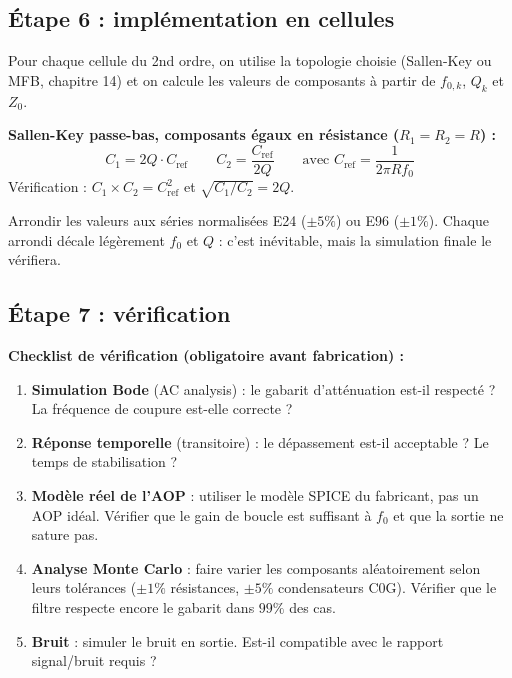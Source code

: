 \documentclass[12pt,a4paper,twoside]{book}
\begin{document}
\subsection{Étape 6 : implémentation en cellules}

Pour chaque cellule du 2nd ordre, on utilise la topologie choisie (Sallen-Key ou MFB, chapitre 14) et on calcule les valeurs de composants à partir de $f_{0,k}$, $Q_k$ et $Z_0$.

\begin{formule}
\textbf{Sallen-Key passe-bas, composants égaux en résistance ($R_1 = R_2 = R$) :}
\[
C_1 = 2Q \cdot C_{\text{ref}} \qquad C_2 = \frac{C_{\text{ref}}}{2Q} \qquad \text{avec } C_{\text{ref}} = \frac{1}{2\pi R f_0}
\]
Vérification : $C_1 \times C_2 = C_{\text{ref}}^2$ et $\sqrt{C_1/C_2} = 2Q$.
\end{formule}

\begin{pratique}
Arrondir les valeurs aux séries normalisées E24 ($\pm 5\%$) ou E96 ($\pm 1\%$). Chaque arrondi décale légèrement $f_0$ et $Q$ : c'est inévitable, mais la simulation finale le vérifiera.
\end{pratique}

\subsection{Étape 7 : vérification}

\begin{pratique}
\textbf{Checklist de vérification (obligatoire avant fabrication) :}

\begin{enumerate}[nosep]
\item \textbf{Simulation Bode} (AC analysis) : le gabarit d'atténuation est-il respecté ? La fréquence de coupure est-elle correcte ?
\item \textbf{Réponse temporelle} (transitoire) : le dépassement est-il acceptable ? Le temps de stabilisation ?
\item \textbf{Modèle réel de l'AOP} : utiliser le modèle SPICE du fabricant, pas un AOP idéal. Vérifier que le gain de boucle est suffisant à $f_0$ et que la sortie ne sature pas.
\item \textbf{Analyse Monte Carlo} : faire varier les composants aléatoirement selon leurs tolérances ($\pm 1\%$ résistances, $\pm 5\%$ condensateurs C0G). Vérifier que le filtre respecte encore le gabarit dans $99\%$ des cas.
\item \textbf{Bruit} : simuler le bruit en sortie. Est-il compatible avec le rapport signal/bruit requis ?
\end{enumerate}
\end{pratique}
\end{document}
